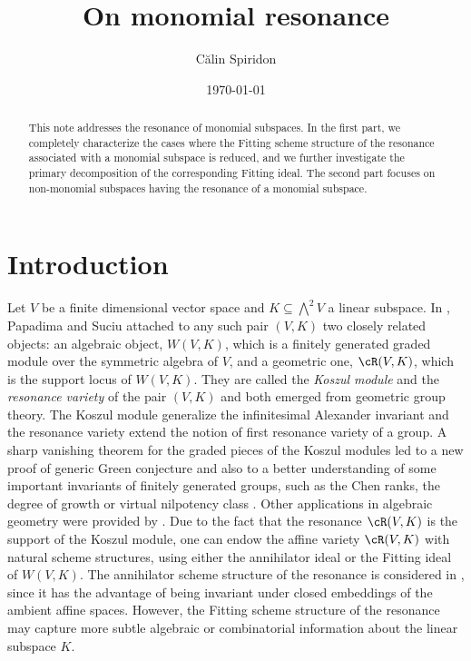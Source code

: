 \documentclass[10pt, leqno]{amsart}
\title{On monomial resonance}
\author{C\u alin Spiridon}
\date{\today}
\begin{document}
\begin{abstract}
This note addresses the resonance of monomial subspaces. In the first part, we completely characterize the cases where the Fitting scheme structure of the resonance associated with a monomial subspace is reduced, and we further investigate the primary decomposition of the corresponding Fitting ideal. The second part focuses on non-monomial subspaces having the resonance of a monomial subspace.
\end{abstract} 

\maketitle


\section{Introduction}

Let $V$ be a finite dimensional vector space and $K \subseteq \bigwedge^2V$ a linear subspace. In \cite{papadima_vanishing_2015}, Papadima and Suciu attached to any such pair $(V,K)$ two closely related objects: an algebraic object, $W(V,K)$, which is a finitely generated graded module over the symmetric algebra of $V$, and a geometric one, $\cR(V,K)$, which is the support locus of $W(V,K)$. They are called the \emph{Koszul module} and the \emph{resonance variety} of the pair $(V,K)$ and both emerged from geometric group theory. The Koszul module generalize the infinitesimal Alexander invariant \cite{papadima_2004} and the resonance variety extend the notion of first resonance variety of a group. A sharp vanishing theorem for the graded pieces of the Koszul modules led to a new proof of generic Green conjecture \cite{aprodu_green_2019} and also to a better understanding of some important invariants of finitely generated groups, such as the Chen ranks, the degree of growth or virtual nilpotency class \cite{aprodu_topological_2022}. Other applications in algebraic geometry were provided by \cite{aprodu_vanishing_2024}. Due to the fact that the resonance $\cR(V,K)$ is the support of the Koszul module, one can endow the affine variety $\cR(V,K)$ with natural scheme structures, using either the annihilator ideal or the Fitting ideal of $W(V,K)$. The annihilator scheme structure of the resonance is considered in \cite{aprodu_reduced_2024}, since it has the advantage of being invariant under closed embeddings of the ambient affine spaces. However, the Fitting scheme structure of the resonance may capture more subtle algebraic or combinatorial information about the linear subspace $K$.
\end{document}
